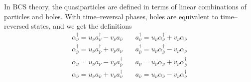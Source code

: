 \begin{subappendices}
In BCS theory, the quasiparticles are defined in terms of linear combinations of particles and holes. With time--reversal phases, holes are equivalent to time--reversed states, and we get the definitions
\begin{equation}\label{eq53}
    \begin{split}
        \alpha^\dagger_\nu=u_\nu a_\nu^\dagger - v_\nu a_{\bar \nu} & \quad
        a^\dagger_\nu=u_\nu \alpha_\nu^\dagger + v_\nu \alpha_{\bar \nu} \\
         \alpha^\dagger_{\bar \nu}=u_\nu a_{\bar \nu}^\dagger + v_\nu a_\nu & \quad
         a^\dagger_{\bar \nu}=u_\nu \alpha_{\bar \nu}^\dagger - v_\nu \alpha_\nu \\
         \alpha_\nu=u_\nu a_\nu - v_\nu a_{\bar \nu}^\dagger & \quad
         a_\nu=u_\nu \alpha_\nu + v_\nu \alpha_{\bar \nu}^\dagger\\
         \alpha_{\bar \nu}=u_\nu a_{\bar \nu} + v_\nu a^\dagger_\nu & \quad
         a_{\bar \nu}=u_\nu \alpha_{\bar \nu} - v_\nu \alpha^\dagger_\nu
     \end{split}
\end{equation}

\end{subappendices}
